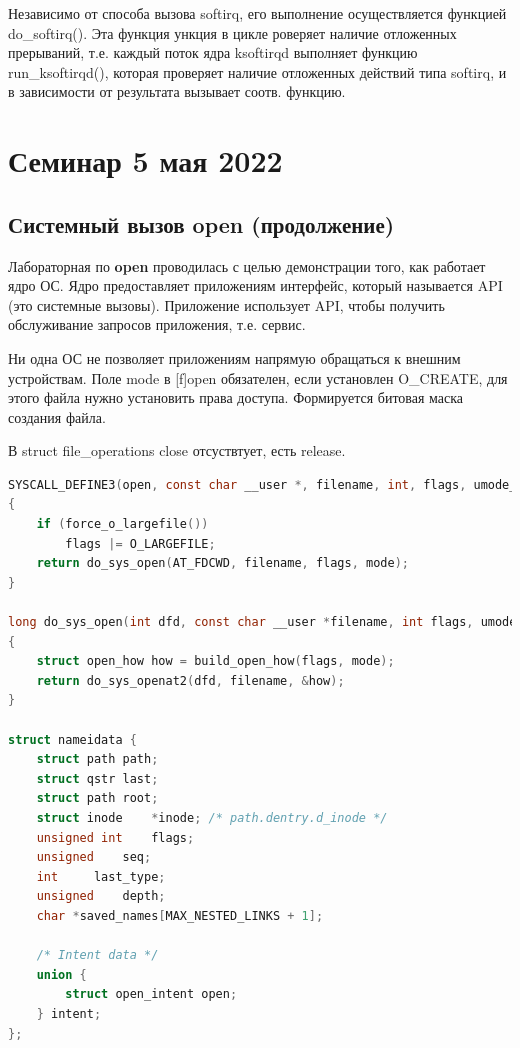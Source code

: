 \documentclass[12pt,a4paper]{scrreprt}
\begin{document}
Независимо от способа вызова softirq, его выполнение осуществляется функцией do\_softirq().
Эта функция ункция в цикле роверяет наличие отложенных прерываний, т.е. каждый поток ядра ksoftirqd выполняет функцию run\_ksoftirqd(), которая проверяет наличие отложенных действий типа softirq, и в зависимости от результата вызывает соотв. функцию.

\begin{figure}[!h]
\end{figure}
	
\chapter{\textbf{Семинар 5 мая 2022}}

\section{Системный вызов open (продолжение)}

Лабораторная по \textbf{open} проводилась с целью демонстрации того, как работает ядро ОС. Ядро предоставляет приложениям интерфейс, который называется API (это системные вызовы). Приложение использует API, чтобы получить обслуживание запросов приложения, т.е. сервис.

Ни одна ОС не позволяет приложениям напрямую обращаться к внешним устройствам. Поле mode в [f]open обязателен, если установлен O\_CREATE, для этого файла нужно установить права доступа. Формируется битовая маска создания файла.

В struct file\_operations close отсуствтует, есть release.

\begin{lstlisting}[language=C]
SYSCALL_DEFINE3(open, const char __user *, filename, int, flags, umode_t, mode)
{
	if (force_o_largefile())
		flags |= O_LARGEFILE;
	return do_sys_open(AT_FDCWD, filename, flags, mode);
}	
	
long do_sys_open(int dfd, const char __user *filename, int flags, umode_t mode)
{
	struct open_how how = build_open_how(flags, mode);
	return do_sys_openat2(dfd, filename, &how);
}

struct nameidata {
	struct path	path;
	struct qstr	last;
	struct path	root;
	struct inode	*inode; /* path.dentry.d_inode */
	unsigned int	flags;
	unsigned	seq;
	int		last_type;
	unsigned	depth;
	char *saved_names[MAX_NESTED_LINKS + 1];
	
	/* Intent data */
	union {
		struct open_intent open;
	} intent;
};
\end{lstlisting}
\end{document}
